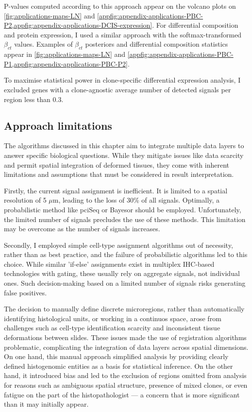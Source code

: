 P-values computed according to this approach appear on the volcano plots on \cref{fig:applications-maps-LN} and \cref{appfig:appendix-applications-PBC-P2,appfig:appendix-applications-DCIS-expression}. For differential composition and protein expression, I used a similar approach with the softmax-transformed $\beta_{ct}$ values. Examples of $\beta_{ct}$ posteriors and differential composition statistics appear in \cref{fig:applications-maps-LN} and \cref{appfig:appendix-applications-PBC-P1,appfig:appendix-applications-PBC-P2}. 

To maximise statistical power in clone-specific differential expression analysis, I excluded genes with a clone-agnostic average number of detected signals per region less than 0.3.

\subsection{Approach limitations}

The algorithms discussed in this chapter aim to integrate multiple data layers to answer specific biological questions. While they mitigate issues like data scarcity and permit spatial integration of deformed tissues, they come with inherent limitations and assumptions that must be considered in result interpretation.

Firstly, the current signal assignment is inefficient. It is limited to a spatial resolution of 5 $\mu$m, leading to the loss of 30\% of all signals. Optimally, a probabilistic method like pciSeq \parencite{Qian2020-mp} or Bayesor \parencite{Petukhov2022-pv} should be employed. Unfortunately, the limited number of signals precludes the use of these methods. This limitation may be overcome as the number of signals increases.

Secondly, I employed simple cell-type assignment algorithms out of necessity, rather than as best practice, and the failure of probabilistic algorithms led to this choice. While similar 'if-else' assignments exist in multiplex \ac{IHC}-based technologies with gating, these usually rely on aggregate signals, not individual ones. Such decision-making based on a limited number of signals risks generating false positives.

The decision to manually define discrete microregions, rather than automatically identifying histological units, or working in a continuos space, arose from challenges such as cell-type identification scarcity and inconsistent tissue deformations between slides. These issues made the use of registration algorithms problematic, complicating the integration of data layers across spatial dimensions. On one hand, this manual approach simplified analysis by providing clearly defined histogenomic entities as a basis for statistical inference. On the other hand, it introduced bias and led to the exclusion of regions omitted from analysis for reasons such as ambiguous spatial structure, presence of mixed clones, or even fatigue on the part of the histopathologist — a concern that is more significant than it may initially appear.

